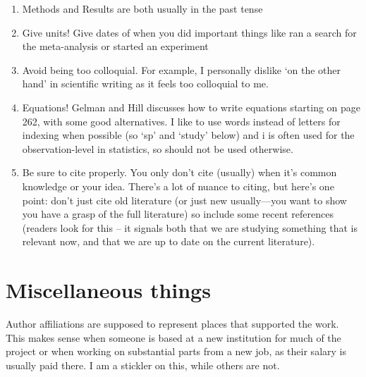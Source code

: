 \documentclass[11pt,letter]{article}
\begin{document}
\begin{enumerate}
\item Methods and Results are both usually in the past tense
\item Give units! Give dates of when you did important things like ran a search for the meta-analysis or started an experiment
\item Avoid being too colloquial. For example, I personally dislike `on the other hand' in scientific writing as it feels too colloquial to me. 
\item Equations! Gelman and Hill discusses how to write equations starting on page 262, with some good alternatives. I like to use words instead of letters for indexing when possible (so `sp' and `study' below) and i is often used for the observation-level in statistics, so should not be used otherwise. 
\item Be sure to cite properly. You only don't cite (usually) when it's common knowledge or your idea. There's a lot of nuance to citing, but here's one point: don't just cite old literature (or just new usually---you want to show you have a grasp of the full literature) so include some recent references (readers look for this -- it signals both that we are studying something that is relevant now, and that we are up to date on the current literature).
\end{enumerate}

\section{Miscellaneous things}

Author affiliations are supposed to represent places that supported the work. This makes sense when someone is based at a new institution for much of the project or when working on substantial parts from a new job, as their salary is usually paid there. I am a stickler on this, while others are not.
\end{document}
